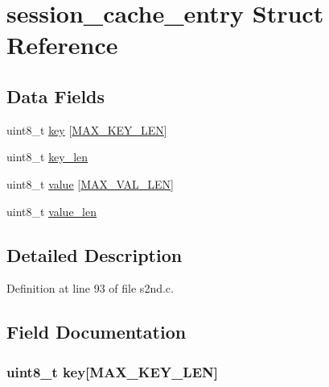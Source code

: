 \hypertarget{structsession__cache__entry}{}\section{session\+\_\+cache\+\_\+entry Struct Reference}
\label{structsession__cache__entry}
\subsection*{Data Fields}
\begin{DoxyCompactItemize}
\item 
uint8\+\_\+t \hyperlink{structsession__cache__entry_adb93d13e245f8373dac16ec300fe8c1d}{key} \mbox{[}\hyperlink{s2nd_8c_ad91bfaf106e42aa552f1605c5b8a9ef2}{M\+A\+X\+\_\+\+K\+E\+Y\+\_\+\+L\+EN}\mbox{]}
\item 
uint8\+\_\+t \hyperlink{structsession__cache__entry_a81d756c926cde8076992a83a9b3ea657}{key\+\_\+len}
\item 
uint8\+\_\+t \hyperlink{structsession__cache__entry_af8b1b26a770e1882441830cadd6b94e7}{value} \mbox{[}\hyperlink{s2nd_8c_a282b0f9613da7596a04d4d8d4279d2a1}{M\+A\+X\+\_\+\+V\+A\+L\+\_\+\+L\+EN}\mbox{]}
\item 
uint8\+\_\+t \hyperlink{structsession__cache__entry_ae02b3e5d161799d5639f0f0b9877997c}{value\+\_\+len}
\end{DoxyCompactItemize}


\subsection{Detailed Description}


Definition at line 93 of file s2nd.\+c.



\subsection{Field Documentation}
\subsubsection[{\texorpdfstring{key}{key}}]{\setlength{\rightskip}{0pt plus 5cm}uint8\+\_\+t key\mbox{[}{\bf M\+A\+X\+\_\+\+K\+E\+Y\+\_\+\+L\+EN}\mbox{]}}\hypertarget{structsession__cache__entry_adb93d13e245f8373dac16ec300fe8c1d}{}\label{structsession__cache__entry_adb93d13e245f8373dac16ec300fe8c1d}


